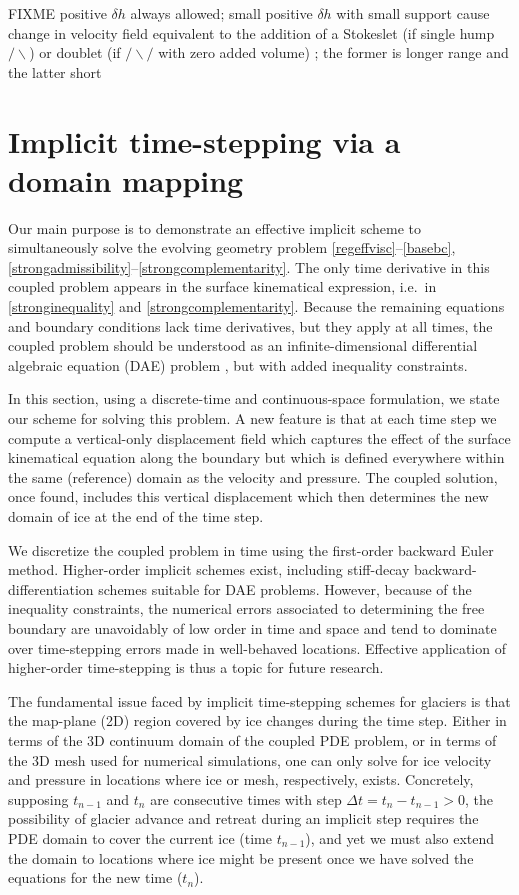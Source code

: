 \documentclass[letterpaper,final,12pt,reqno]{amsart}
\begin{document}
FIXME positive $\delta h$ always allowed; small positive $\delta h$ with small support cause change in velocity field equivalent to the addition of a Stokeslet (if single hump $/\backslash$) or doublet (if $/\backslash/$ with zero added volume) \cite{ChwangWu1975}; the former is longer range and the latter short


\section{Implicit time-stepping via a domain mapping} \label{sec:implicitstep}

Our main purpose is to demonstrate an effective implicit scheme to simultaneously solve the evolving geometry problem \eqref{regeffvisc}--\eqref{basebc}, \eqref{strongadmissibility}--\eqref{strongcomplementarity}.  The only time derivative in this coupled problem appears in the surface kinematical expression, i.e.~in \eqref{stronginequality} and \eqref{strongcomplementarity}.  Because the remaining equations and boundary conditions lack time derivatives, but they apply at all times, the coupled problem should be understood as an infinite-dimensional differential algebraic equation (DAE) problem \cite{AscherPetzold1998}, but with added inequality constraints.

In this section, using a discrete-time and continuous-space formulation, we state our scheme for solving this problem.  A new feature is that at each time step we compute a vertical-only displacement field which captures the effect of the surface kinematical equation along the boundary but which is defined everywhere within the same (reference) domain as the velocity and pressure.  The coupled solution, once found, includes this vertical displacement which then determines the new domain of ice at the end of the time step.

We discretize the coupled problem in time using the first-order backward Euler method.  Higher-order implicit schemes exist, including stiff-decay backward-differentiation schemes \cite{AscherPetzold1998,Bueler2021} suitable for DAE problems.  However, because of the inequality constraints, the numerical errors associated to determining the free boundary are unavoidably of low order in time and space \cite{Bueler2020} and tend to dominate over time-stepping errors made in well-behaved locations.  Effective application of higher-order time-stepping is thus a topic for future research.

The fundamental issue faced by implicit time-stepping schemes for glaciers is that the map-plane (2D) region covered by ice changes during the time step.  Either in terms of the 3D continuum domain of the coupled PDE problem, or in terms of the 3D mesh used for numerical simulations, one can only solve for ice velocity and pressure in locations where ice or mesh, respectively, exists.  Concretely, supposing $t_{n-1}$ and $t_n$ are consecutive times with step $\Delta t = t_n - t_{n-1} > 0$, the possibility of glacier advance and retreat during an implicit step requires the PDE domain to cover the current ice (time $t_{n-1}$), and yet we must also extend the domain to locations where ice might be present once we have solved the equations for the new time ($t_n$).
\end{document}
